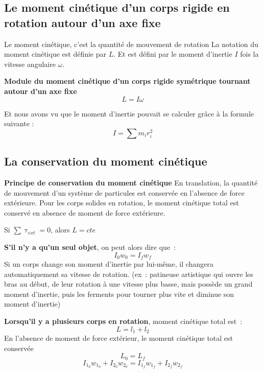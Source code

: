 \documentclass{article}
\begin{document}
\subsection{Le moment cinétique d'un corps rigide en rotation autour d'un axe fixe}
Le moment cinétique, c'est la quantité de mouvement de rotation
\newline
La notation du moment cinétique est définie par $L$. Et est défini par le moment d'inertie $I$ fois la vitesse angulaire $\omega$.
\newline

\noindent
\textbf{Module du moment cinétique d'un corps rigide symétrique tournant autour d'un axe fixe}
\[L = I\omega\]
\newline

Et nous avons vu que le moment d'inertie pouvait se calculer grâce à la formule suivante :
\[I = \sum m_ir_i^2\]
\newline

\subsection{La conservation du moment cinétique}
\textbf{Principe de conservation du moment cinétique}
\newline
En translation, la quantité de mouvement d'un système de particules est conservée en l'absence de force extérieure.
\newline
Pour les corps solides en rotation, le moment cinétique total est conservé en absence de moment de force extérieure.
\newline

Si $\sum \uptau_{ext} = 0$, alors $L = cte$
\newline

\textbf{S'il n'y a qu'un seul objet}, on peut alors dire que :
\[I_0w_0 = I_fw_f\]
Si un corps change son moment d'inertie par lui-même, il changera automatiquement sa vitesse de rotation. (ex : patineuse artistique qui ouvre les bras au début, de leur rotation à une vitesse plus basse, mais possède un grand moment d'inertie, puis les ferments pour tourner plus vite et diminue son moment d'inertie)
\newline

\textbf{Lorsqu'il y a plusieurs corps en rotation}, moment cinétique total est :
\[L = l_1 + l_2\]
En l'absence de moment de force extérieur, le moment cinétique total est conservée
\[L_0 = L_f\]
\[I_{1_0}w_{1_0} + I_{2_0}w_{2_0} = I_{1_f}w_{1_f} + I_{2_f}w_{2_f}\]
\end{document}

